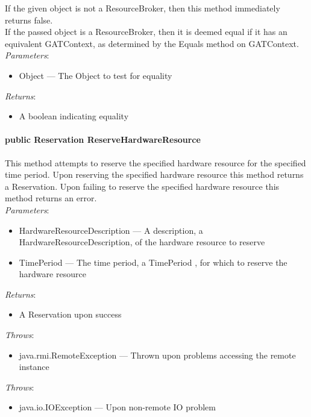 \documentclass[$Date: 2003/06/26 19:29:31 $]{glabarticle}
\begin{document}
 If the given object is not a ResourceBroker, then this method immediately returns false. \\
 
 If the passed object is a ResourceBroker, then it is deemed equal if it has an equivalent GATContext, 
 as determined by the Equals method on GATContext. \\
  
\textit{Parameters}:
\begin{itemize}
\item[] Object --- The Object to test for equality 
\end{itemize}

\textit{Returns}:
\begin{itemize}
\item[] A boolean indicating equality
\end{itemize}

\paragraph{public Reservation ReserveHardwareResource}

This method attempts to reserve the specified hardware resource for the specified time period. Upon
reserving the specified hardware resource this method returns a Reservation. Upon failing to 
reserve the specified hardware resource this method returns an error. \\

\textit{Parameters}:
\begin{itemize}
\item[] HardwareResourceDescription --- A description, a HardwareResourceDescription, of the 
hardware resource to reserve
\item[] TimePeriod --- The time period, a TimePeriod , for which to reserve the hardware resource 
\end{itemize}

\textit{Returns}:
\begin{itemize}
\item[] A Reservation upon success 
\end{itemize}

 \textit{Throws}:
 \begin{itemize}
 \item[] java.rmi.RemoteException --- Thrown upon problems accessing the remote instance 
 \end{itemize}
 
\textit{Throws}:
\begin{itemize}
\item[] java.io.IOException --- Upon non-remote IO problem 
\end{itemize}
\end{document}
